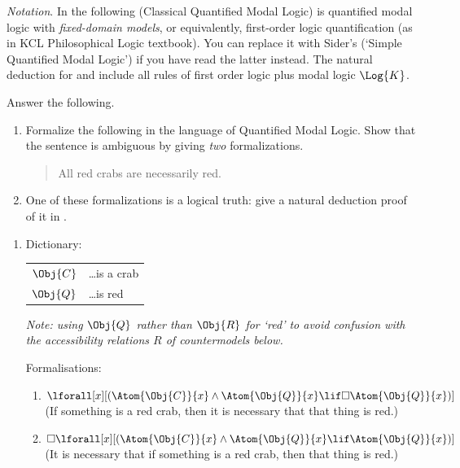 \documentclass[../../../include/open-logic-section]{subfiles}
\begin{document}

\emph{Notation}. In the following  (Classical Quantified
Modal Logic) is quantified modal logic with \emph{fixed-domain
models}, or equivalently, first-order logic quantification (as in KCL
Philosophical Logic textbook). You can replace it with Sider's
 (`Simple Quantified Modal Logic') if you have read the
latter instead. The natural deduction for  and 
include all rules of first order logic plus modal logic $\Log{K}$.

\begin{prob}
    Answer the following.
    \begin{enumerate}
    \item 
    Formalize the following in the language of Quantified Modal Logic.
    Show that the sentence is ambiguous by giving \emph{two}
    formalizations. 
    \begin{quote}
        All red crabs are necessarily red.
    \end{quote}
    
    \item
    One of these formalizations is a logical truth: give a natural 
    deduction proof of it in . 
    \end{enumerate}

    \begin{ans}
    \begin{enumerate}
    \item Dictionary:\
    
        \begin{tabular}{ll}
        $\Obj{C}$ & \dots is a crab \\
        $\Obj{Q}$ & \dots is red \\
        \end{tabular}

    \emph{Note: using $\Obj{Q}$ rather than $\Obj{R}$ for `red' to
    avoid confusion with the accessibility relations $R$ of
    countermodels below.}
    
    Formalisations:

        \begin{enumerate}
        \item $\lforall[x][(\Atom{\Obj{C}}{x}\land \Atom{\Obj{Q}}{x}
            \lif \Box\Atom{\Obj{Q}}{x})]$ (If something is a red crab,
            then it is necessary that that thing is red.)
        \item $\Box \lforall[x][(\Atom{\Obj{C}}{x}\land
            \Atom{\Obj{Q}}{x} \lif \Atom{\Obj{Q}}{x})]$ (It is
            necessary that if something is a red crab, then that thing
            is red.)
        \end{enumerate}


\end{enumerate}
\end{ans}
\end{prob}
\end{document}
